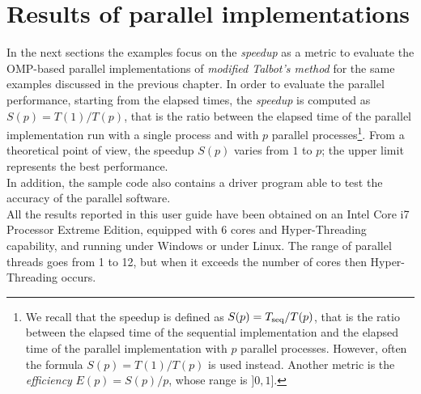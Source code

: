 \documentclass[a4paper,10pt]{report}%
\begin{document}
\section{Results of parallel implementations}\label{OMP:RESULTS}
In the next sections the examples focus on the {\em speedup} as a metric to evaluate the OMP-based parallel
implementations of {\em modified Talbot's method} for the same examples discussed in the previous chapter.
In order to evaluate the parallel performance, starting from the elapsed times, the {\em speedup} is computed as
$S(p) = T(1)/T(p)$, that is the ratio between the elapsed time of the parallel implementation run with a single
process and with $p$ parallel processes\footnote{ We recall that the speedup is defined as
$S(p) = T_{\rm seq}/T(p)$, that is the ratio between the elapsed time of the sequential implementation and the
elapsed time of the parallel implementation with $p$ parallel processes. However, often the formula
$S(p) = T(1)/T(p)$ is used instead. Another metric is the {\em efficiency} $E(p)=S(p)/p$, whose range is $]0,1]$.
}.
From a theoretical point of view, the speedup $S(p)$ varies from $1$ to $p$; the upper limit represents the best
performance.
\\
In addition, the sample code also contains a driver program able to test the accuracy of the parallel software.
\\
All the results reported in this user guide have been obtained on an Intel Core i7 Processor Extreme Edition, equipped with 6 cores and Hyper-Threading capability, and running under Windows or under Linux. The range of
parallel threads goes from 1 to 12, but when it exceeds the number of cores then Hyper-Threading occurs.
\end{document}
